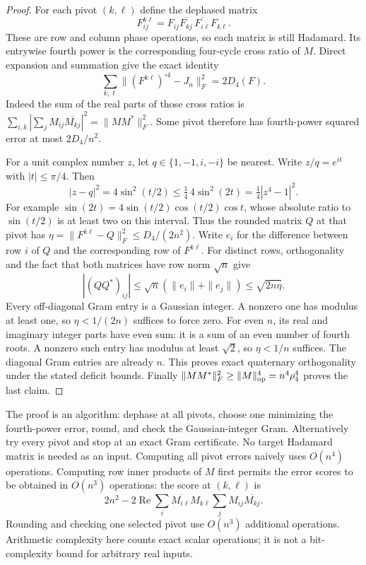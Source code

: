 \documentclass[11pt]{article}
\begin{document}
\begin{proof}
For each pivot $(k,\ell)$ define the dephased matrix
\[
 F^{k\ell}_{ij}
 =F_{ij}\overline{F_{kj}}\,
       \overline{F_{i\ell}}F_{k\ell}.
\]
These are row and column phase operations, so each matrix is still
Hadamard. Its entrywise fourth power is the corresponding four-cycle
cross ratio of $M$. Direct expansion and summation give the exact identity
\[
 \sum_{k,\ell}\|(F^{k\ell})^{\circ4}-J_n\|_F^2=2D_4(F).
\]
Indeed the sum of the real parts of those cross ratios is
$\sum_{i,k}|\sum_j M_{ij}\overline{M_{kj}}|^2=\|MM^*\|_F^2$.
Some pivot therefore has fourth-power squared error at most
$2D_4/n^2$.

For a unit complex number $z$, let $q\in\{1,-1,i,-i\}$ be nearest.
Write $z/q=e^{it}$ with $|t|\le\pi/4$. Then
\[
 |z-q|^2=4\sin^2(t/2)\le
 \tfrac14\,4\sin^2(2t)=\tfrac14|z^4-1|^2.
\]
For example $\sin(2t)=4\sin(t/2)\cos(t/2)\cos t$, whose absolute
ratio to $\sin(t/2)$ is at least two on this interval.
Thus the rounded matrix $Q$ at that pivot has
$\eta=\|F^{k\ell}-Q\|_F^2\le D_4/(2n^2)$.
Write $e_i$ for the difference between row $i$ of $Q$ and the
corresponding row of $F^{k\ell}$. For distinct rows, orthogonality
and the fact that both matrices have row norm $\sqrt n$ give
\[
 |(QQ^*)_{ij}|
 \le\sqrt n(\|e_i\|+\|e_j\|)
 \le\sqrt{2n\eta}.
\]
Every off-diagonal Gram entry is a Gaussian integer. A nonzero one
has modulus at least one, so $\eta<1/(2n)$ suffices to force zero.
For even $n$, its real and imaginary integer parts have even sum:
it is a sum of an even number of fourth roots. A nonzero such entry
has modulus at least $\sqrt2$, so $\eta<1/n$ suffices.
The diagonal Gram entries are already $n$. This proves exact
quaternary orthogonality under the stated deficit bounds. Finally
$\|MM^*\|_F^2\ge\|M\|_{\rm op}^4=n^4\rho_4^4$ proves the last claim.
\end{proof}

The proof is an algorithm: dephase at all pivots, choose one minimizing
the fourth-power error, round, and check the Gaussian-integer Gram.
Alternatively try every pivot and stop at an exact Gram certificate.
No target Hadamard matrix is needed as an input. Computing all pivot
errors naively uses $O(n^4)$ operations. Computing row inner products
of $M$ first permits the error scores to be obtained in $O(n^3)$
operations: the score at $(k,\ell)$ is
\[
 2n^2-2\operatorname{Re}\sum_i
   \overline{M_{i\ell}}M_{k\ell}
   \sum_j M_{ij}\overline{M_{kj}}.
\]
Rounding and checking one selected pivot use $O(n^3)$ additional
operations. Arithmetic complexity here counts exact scalar operations;
it is not a bit-complexity bound for arbitrary real inputs.
\end{document}
